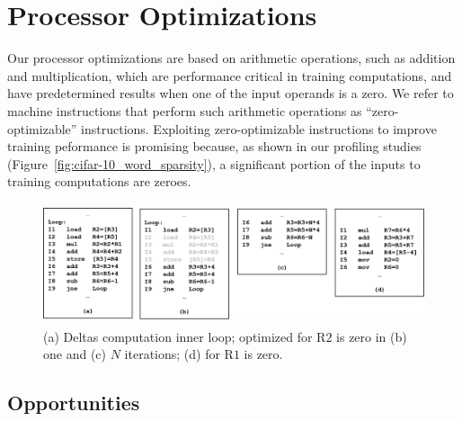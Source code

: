 \section{Processor Optimizations}
\label{sec:processor_opt}

Our processor optimizations are based on arithmetic operations, such as addition and multiplication, which are performance critical in training computations, and have predetermined results when one of the input operands is a zero. We refer to machine instructions that perform such arithmetic operations as ``zero-optimizable'' instructions. Exploiting zero-optimizable instructions to improve training peformance is promising because, as shown in our profiling studies (Figure~\ref{fig:cifar-10_word_sparsity}), a significant portion of the inputs to training computations are zeroes. 

\begin{figure}
\centering
\includegraphics[height=1.4in, width=1.9\columnwidth]{Figures/deltas_code_opt.png}
\caption{(a) Deltas computation inner loop;  optimized for R$2$ is zero in (b) one and (c) $N$ iterations; (d) for R$1$ is zero.}
\label{fig:deltas_code_opt}
\end{figure}


\subsection{Opportunities}


